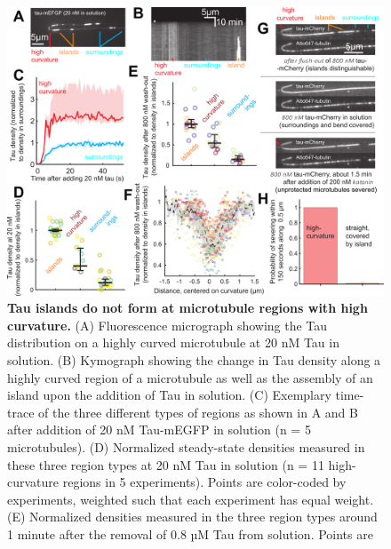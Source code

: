 \begin{figure}[h!]
	\centering
	\includegraphics[width=1\linewidth]{Figures/Taucurve.png}
	\caption[Tau islands do not form at microtubule regions with high curvature.]{
	\textbf{Tau islands do not form at microtubule regions with high curvature.} (A) Fluorescence micrograph showing the Tau distribution on a highly curved microtubule at 20 nM Tau in solution. (B) Kymograph showing the change in Tau density along a highly curved region of a microtubule as well as the assembly of an island upon the addition of Tau in solution. (C) Exemplary time-trace of the three different types of regions as shown in A and B after addition of 20 nM Tau-mEGFP in solution (n = 5 microtubules). (D) Normalized steady-state densities measured in these three region types at 20 nM Tau in solution (n = 11 high-curvature regions in 5 experiments). Points are color-coded by experiments, weighted such that each experiment has equal weight. (E) Normalized densities measured in the three region types around 1 minute after the removal of 0.8 µM Tau from solution. Points are
}
\end{figure}

